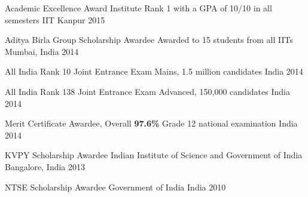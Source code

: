 
\vspace{-0.3cm}



\begin{cvhonors}


  \cvhonor
  {Academic Excellence Award} %
  {Institute Rank 1 with a GPA of 10/10 in all semesters} %
  {IIT Kanpur} %
  {2015} %

  \cvhonor
  {Aditya Birla Group Scholarship Awardee}
  {Awarded to 15 students from all IITs}
  {Mumbai, India}
  {2014}

  \cvhonor
  {All India Rank 10} %
  {Joint Entrance Exam Mains, 1.5 million candidates} %
  {India} %
  {2014} %


  \cvhonor
  {All India Rank 138} %
  {Joint Entrance Exam Advanced, 150,000 candidates} %
  {India} %
  {2014} %

  \cvhonor
  {Merit Certificate Awardee, Overall \textbf{97.6\%}}
  {Grade 12 national examination}
  {India}
  {2014}

  \cvhonor
  {KVPY Scholarship Awardee}
  {Indian Institute of Science and Government of India}
  {Bangalore, India}
  {2013}

  \cvhonor
  {NTSE Scholarship Awardee}
  {Government of India}
  {India}
  {2010}


\end{cvhonors}

